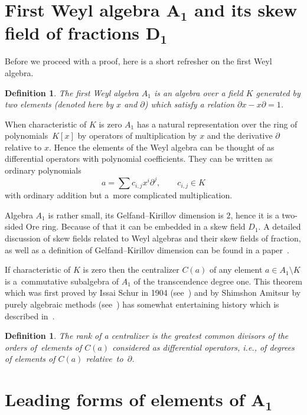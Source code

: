 \documentclass[pdftex]{sigma}
\numberwithin{equation}{section}
\newtheorem{Definition}[Theorem]{Definition}
\newcommand{\de}{\partial}
\begin{document}
\section[First Weyl algebra A1 and its skew field of fractions D1]
{First Weyl algebra $\boldsymbol{A_1}$ and its skew field of fractions $\boldsymbol{D_1}$}\label{2q0}

Before we proceed with a proof, here is a short refresher on the first Weyl algebra.

\begin{Definition}
The first Weyl algebra $A_1$ is an algebra over a field $K$
generated by two elements (denoted here by $x$ and $\de$) which satisfy a
relation $\de x - x \de = 1$.
\end{Definition}

When characteristic of $K$ is zero $A_1$ has a
natural representation over the ring of polyno\-mi\-als~$K[x]$ by operators of
multiplication by $x$ and the derivative $\de$ relative to $x$. Hence the
elements of the Weyl algebra can be thought of as differential operators
with polynomial coefficients. They can be written as ordinary polynomials
\[
a= \sum c_{i,j}x^i\de^j,\qquad c_{i,j} \in K
\]
with ordinary addition but a~more complicated
multiplication.

Algebra $A_1$ is rather small, its Gelfand--Kirillov dimension is $2$, hence it is a two-sided Ore ring. Because of that it can be embedded in a skew field $D_1$. A detailed discussion of skew fields related to Weyl algebras and their skew fields of fraction, as well as a definition of Gelfand--Kirillov dimension can be found in a paper~\cite{GK}.

If characteristic of $K$ is zero then the centralizer $C(a)$ of any
element $a \in A_1\setminus K$ is a~com\-mutative subalgebra of $A_1$ of the transcendence degree one. This
theorem which was first proved by Issai Schur in 1904 (see~\cite{S}) and by Shimshon Amitsur by purely algebraic methods (see~\cite{A}) has somewhat
entertaining history which is described in~\cite{ML}.

\begin{Definition}
The rank of a centralizer is the greatest common divisors of the orders of~elements of $C(a)$ considered as differential operators,
i.e., of degrees of elements of $C(a)$ rela\-tive~to~$\de$.
\end{Definition}

\section[Leading forms of elements of A1]{Leading forms of elements of $\boldsymbol{A_1}$}\label{3a}
\end{document}
